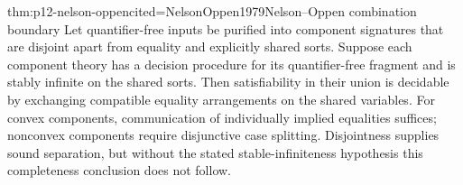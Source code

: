 \begin{hbtheorem}{thm:p12-nelson-oppen}{cited=NelsonOppen1979}{Nelson--Oppen combination boundary}
Let quantifier-free inputs be purified into component signatures that are
disjoint apart from equality and explicitly shared sorts.  Suppose each
component theory has a decision procedure for its quantifier-free fragment and
is stably infinite on the shared sorts.  Then satisfiability in their union is
decidable by exchanging compatible equality arrangements on the shared
variables.  For convex components, communication of individually implied
equalities suffices; nonconvex components require disjunctive case splitting.
Disjointness supplies sound separation, but without the stated
stable-infiniteness hypothesis this completeness conclusion does not follow.
\end{hbtheorem}

